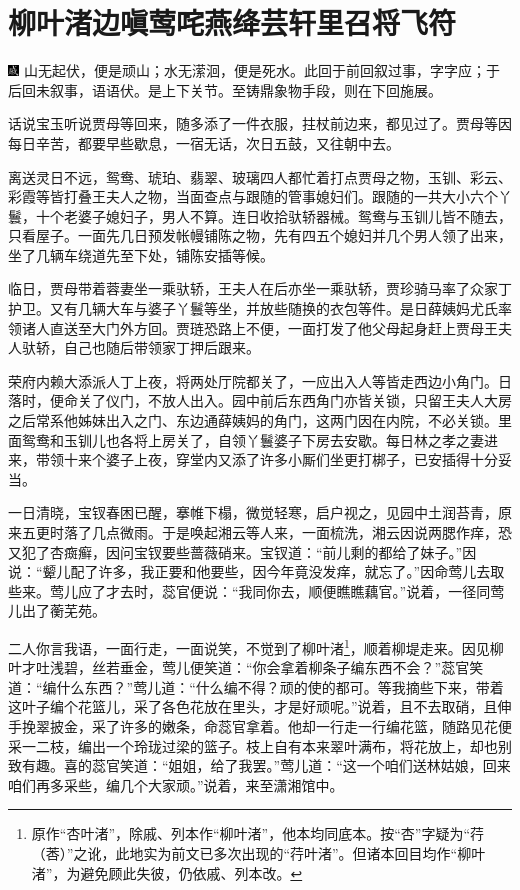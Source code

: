 

\chapter{柳叶渚边嗔莺咤燕\hspace{.5em}绛芸轩里召将飞符}

{\includegraphics[width=3mm]{../Images/00005}  \kaishu 山无起伏，便是顽山；水无潆洄，便是死水。此回于前回叙过事，字字应；于后回未叙事，语语伏。是上下关节。至铸鼎象物手段，则在下回施展。}

话说宝玉听说贾母等回来，随多添了一件衣服，拄杖前边来，都见过了。贾母等因每日辛苦，都要早些歇息，一宿无话，次日五鼓，又往朝中去。

离送灵日不远，鸳鸯、琥珀、翡翠、玻璃四人都忙着打点贾母之物，玉钏、彩云、彩霞等皆打叠王夫人之物，当面查点与跟随的管事媳妇们。跟随的一共大小六个丫鬟，十个老婆子媳妇子，男人不算。连日收拾驮轿器械。鸳鸯与玉钏儿皆不随去，只看屋子。一面先几日预发帐幔铺陈之物，先有四五个媳妇并几个男人领了出来，坐了几辆车绕道先至下处，铺陈安插等候。

临日，贾母带着蓉妻坐一乘驮轿，王夫人在后亦坐一乘驮轿，贾珍骑马率了众家丁护卫。又有几辆大车与婆子丫鬟等坐，并放些随换的衣包等件。是日薛姨妈尤氏率领诸人直送至大门外方回。贾琏恐路上不便，一面打发了他父母起身赶上贾母王夫人驮轿，自己也随后带领家丁押后跟来。

荣府内赖大添派人丁上夜，将两处厅院都关了，一应出入人等皆走西边小角门。日落时，便命关了仪门，不放人出入。园中前后东西角门亦皆关锁，只留王夫人大房之后常系他姊妹出入之门、东边通薛姨妈的角门，这两门因在内院，不必关锁。里面鸳鸯和玉钏儿也各将上房关了，自领丫鬟婆子下房去安歇。每日林之孝之妻进来，带领十来个婆子上夜，穿堂内又添了许多小厮们坐更打梆子，已安插得十分妥当。

一日清晓，宝钗春困已醒，搴帷下榻，微觉轻寒，启户视之，见园中土润苔青，原来五更时落了几点微雨。于是唤起湘云等人来，一面梳洗，湘云因说两腮作痒，恐又犯了杏癍癣，因问宝钗要些蔷薇硝来。宝钗道：“前儿剩的都给了妹子。”因说：“颦儿配了许多，我正要和他要些，因今年竟没发痒，就忘了。”因命莺儿去取些来。莺儿应了才去时，蕊官便说：“我同你去，顺便瞧瞧藕官。”说着，一径同莺儿出了蘅芜苑。

二人你言我语，一面行走，一面说笑，不觉到了柳叶渚\footnote{原作“杏叶渚”，除戚、列本作“柳叶渚”，他本均同底本。按“杏”字疑为“荇（莕）”之讹，此地实为前文已多次出现的“荇叶渚”。但诸本回目均作“柳叶渚”，为避免顾此失彼，仍依戚、列本改。}，顺着柳堤走来。因见柳叶才吐浅碧，丝若垂金，莺儿便笑道：“你会拿着柳条子编东西不会？”蕊官笑道：“编什么东西？”莺儿道：“什么编不得？顽的使的都可。等我摘些下来，带着这叶子编个花篮儿，采了各色花放在里头，才是好顽呢。”说着，且不去取硝，且伸手挽翠披金，采了许多的嫩条，命蕊官拿着。他却一行走一行编花篮，随路见花便采一二枝，编出一个玲珑过梁的篮子。枝上自有本来翠叶满布，将花放上，却也别致有趣。喜的蕊官笑道：“姐姐，给了我罢。”莺儿道：“这一个咱们送林姑娘，回来咱们再多采些，编几个大家顽。”说着，来至潇湘馆中。

